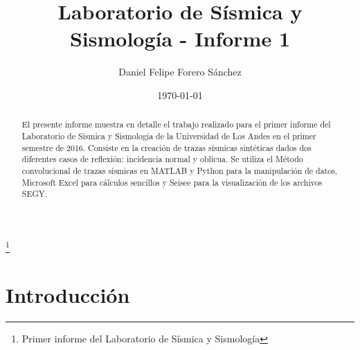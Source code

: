 \documentclass[%
 aip,
 jmp,%
 amsmath,amssymb,
 reprint,%
]{revtex4-1}
\begin{document}

\title[Laboratorio de Sísmica y Sismología]{Laboratorio de Sísmica y Sismología - Informe 1}%
\thanks{Primer informe del Laboratorio de Sísmica y Sismología}

\author{Daniel Felipe Forero Sánchez}


\date{\today}%

\begin{abstract}
El presente informe muestra en detalle el trabajo realizado para el primer informe del Laboratorio de Sísmica y Sismología \cite{taller} de la Universidad de Los Andes en el primer semestre de 2016. Consiste en la creación de trazas sísmicas sintéticas dados dos diferentes casos de reflexión: incidencia normal y oblicua. Se utiliza el Método convolucional de trazas sísmicas en MATLAB y Python para la manipulación de datos, Microsoft Excel para cálculos sencillos y Seisee para la visualización de los archivos SEGY.
%

\end{abstract}


\maketitle


\section{Introducción}
\end{document}
